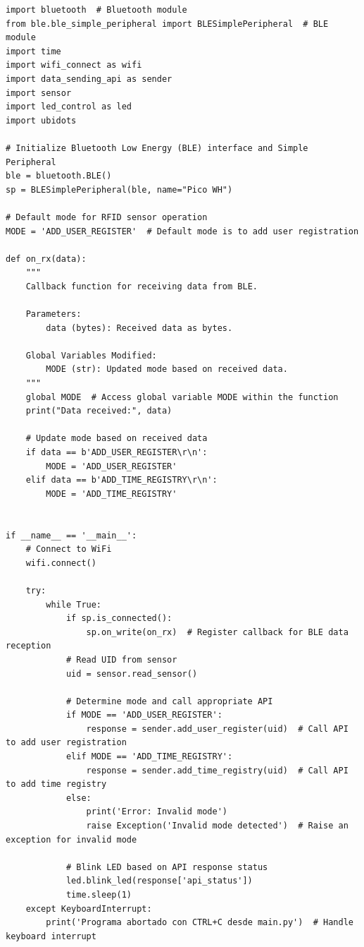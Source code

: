\documentclass{article}
\begin{document}
\begin{lstlisting}
import bluetooth  # Bluetooth module
from ble.ble_simple_peripheral import BLESimplePeripheral  # BLE module
import time
import wifi_connect as wifi
import data_sending_api as sender
import sensor
import led_control as led
import ubidots

# Initialize Bluetooth Low Energy (BLE) interface and Simple Peripheral
ble = bluetooth.BLE()
sp = BLESimplePeripheral(ble, name="Pico WH")

# Default mode for RFID sensor operation
MODE = 'ADD_USER_REGISTER'  # Default mode is to add user registration

def on_rx(data):
    """
    Callback function for receiving data from BLE.

    Parameters:
        data (bytes): Received data as bytes.

    Global Variables Modified:
        MODE (str): Updated mode based on received data.
    """
    global MODE  # Access global variable MODE within the function
    print("Data received:", data)

    # Update mode based on received data
    if data == b'ADD_USER_REGISTER\r\n':
        MODE = 'ADD_USER_REGISTER'
    elif data == b'ADD_TIME_REGISTRY\r\n':
        MODE = 'ADD_TIME_REGISTRY'


if __name__ == '__main__':
    # Connect to WiFi
    wifi.connect()

    try:    
        while True:
            if sp.is_connected():
                sp.on_write(on_rx)  # Register callback for BLE data reception
            # Read UID from sensor
            uid = sensor.read_sensor()
            
            # Determine mode and call appropriate API
            if MODE == 'ADD_USER_REGISTER':
                response = sender.add_user_register(uid)  # Call API to add user registration
            elif MODE == 'ADD_TIME_REGISTRY':
                response = sender.add_time_registry(uid)  # Call API to add time registry
            else:
                print('Error: Invalid mode')
                raise Exception('Invalid mode detected')  # Raise an exception for invalid mode
            
            # Blink LED based on API response status
            led.blink_led(response['api_status'])
            time.sleep(1)
    except KeyboardInterrupt:
        print('Programa abortado con CTRL+C desde main.py')  # Handle keyboard interrupt
\end{lstlisting}
\end{document}
